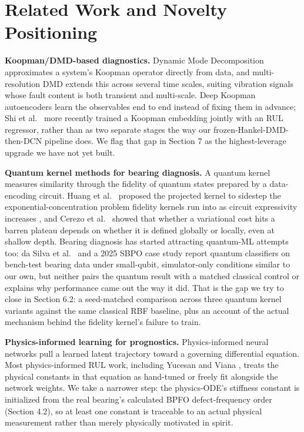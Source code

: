\documentclass[3p,times,procedia]{elsarticle}
\begin{document}
\section{Related Work and Novelty Positioning}

\textbf{Koopman/DMD-based diagnostics.} Dynamic Mode Decomposition \cite{kutz2016} approximates a system's Koopman operator directly from data, and multi-resolution DMD extends this across several time scales, suiting vibration signals whose fault content is both transient and multi-scale. Deep Koopman autoencoders \cite{lusch2018} learn the observables end to end instead of fixing them in advance; Shi et al.\ \cite{shi2024} more recently trained a Koopman embedding jointly with an RUL regressor, rather than as two separate stages the way our frozen-Hankel-DMD-then-DCN pipeline does. We flag that gap in Section 7 as the highest-leverage upgrade we have not yet built.

\textbf{Quantum kernel methods for bearing diagnosis.} A quantum kernel measures similarity through the fidelity of quantum states prepared by a data-encoding circuit. Huang et al.\ \cite{huang2021} proposed the projected kernel to sidestep the exponential-concentration problem fidelity kernels run into as circuit expressivity increases \cite{thanasilp2024}, and Cerezo et al.\ \cite{cerezo2021} showed that whether a variational cost hits a barren plateau depends on whether it is defined globally or locally, even at shallow depth. Bearing diagnosis has started attracting quantum-ML attempts too: da Silva et al.\ \cite{dasilva2024} and a 2025 SBPO case study \cite{sbpo2025} report quantum classifiers on bench-test bearing data under small-qubit, simulator-only conditions similar to our own, but neither pairs the quantum result with a matched classical control or explains why performance came out the way it did. That is the gap we try to close in Section 6.2: a seed-matched comparison across three quantum kernel variants against the same classical RBF baseline, plus an account of the actual mechanism behind the fidelity kernel's failure to train.

\textbf{Physics-informed learning for prognostics.} Physics-informed neural networks \cite{raissi2019} pull a learned latent trajectory toward a governing differential equation. Most physics-informed RUL work, including Yucesan and Viana \cite{yucesan2019}, treats the physical constants in that equation as hand-tuned or freely fit alongside the network weights. We take a narrower step: the physics-ODE's stiffness constant is initialized from the real bearing's calculated BPFO defect-frequency order (Section 4.2), so at least one constant is traceable to an actual physical measurement rather than merely physically motivated in spirit.
\end{document}

